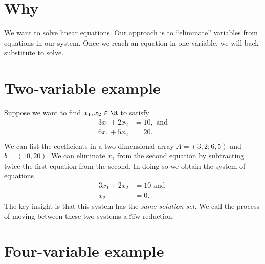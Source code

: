 
\section*{Why}

We want to solve linear equations.
Our approach is to ``eliminate'' variables from equations in our system.
Once we reach an equation in one variable, we will back-substitute to solve.

\section*{Two-variable example}

Suppose we want to find $x_1, x_2 \in \R $ to satisfy
\[
\begin{aligned}
3x_1 + 2x_2 &= 10, \text{ and} \\
6x_1 + 5x_2 &= 20. \\
\end{aligned}
\]
We can list the coefficients in a two-dimensional array $A = (3, 2; 6, 5)$ and $b = (10,20)$.
We can eliminate $x_1$ from the second equation by subtracting twice the first equation from the second.
In doing so we obtain the system of equations
\[
\begin{aligned}
3x_1 + 2x_2 &= 10 \text{ and } \\
x_2 &= 0.
\end{aligned}
\]
The key insight is that this system has the \textit{same solution set}.
We call the process of moving between these two systems a \t{row reduction}.

\section*{Four-variable example}

